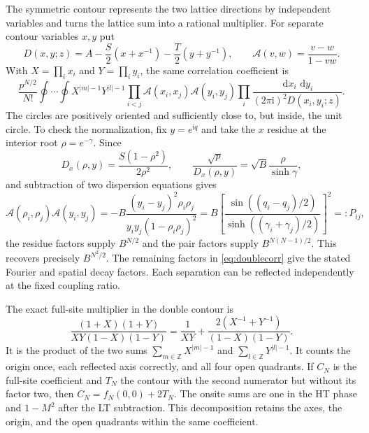 \documentclass[11pt]{article}
\numberwithin{equation}{section}
\theoremstyle{definition}
\newcommand{\Z}{\mathbb Z}
\newcommand{\dd}{\,\mathrm d}
\newcommand{\ii}{\mathrm i}
\newcommand{\cA}{\mathscr A}
\begin{document}
The symmetric contour represents the two lattice directions by
independent variables and turns the lattice sum into a rational
multiplier.
For separate contour variables $x,y$ put
\begin{equation}\label{eq:Dpoly}
 D(x,y;z)=A-\frac S2(x+x^{-1})-\frac T2(y+y^{-1}),\qquad
 \cA(v,w)=\frac{v-w}{1-vw}.
\end{equation}
With $X=\prod_i x_i$ and $Y=\prod_i y_i$, the same correlation
coefficient is
\begin{equation}\label{eq:doublecorr}
 \frac{p^{N/2}}{N!}\oint\cdots\oint
 X^{|m|-1}Y^{|l|-1}
 \prod_{i<j}\cA(x_i,x_j)\cA(y_i,y_j)
 \prod_i\frac{\dd x_i\,\dd y_i}{(2\pi\ii)^2D(x_i,y_i;z)}.
\end{equation}
The circles are positively oriented and sufficiently close to, but inside,
the unit circle. To check the normalization, fix $y=e^{\ii q}$ and
take the $x$ residue at the interior root $\rho=e^{-\gamma}$.
Since
\[
 D_x(\rho,y)=\frac{S(1-\rho^2)}{2\rho^2},\qquad
 \frac{\sqrt p}{D_x(\rho,y)}=\sqrt B\frac{\rho}{\sinh\gamma},
\]
and subtraction of two dispersion equations gives
\begin{equation}\label{eq:cancelpair}
 \cA(\rho_i,\rho_j)\cA(y_i,y_j)
 =-B\frac{(y_i-y_j)^2\rho_i\rho_j}
           {y_iy_j(1-\rho_i\rho_j)^2}
 =B\left[\frac{\sin((q_i-q_j)/2)}
               {\sinh((\gamma_i+\gamma_j)/2)}\right]^2=:P_{ij},
\end{equation}
the residue factors supply $B^{N/2}$ and the pair factors supply
$B^{N(N-1)/2}$. This recovers precisely $B^{N^2/2}$.
The remaining factors in \eqref{eq:doublecorr} give the stated Fourier
and spatial decay factors. Each separation can be reflected
independently at the fixed coupling ratio.

The exact full-site multiplier in the double contour is
\begin{equation}\label{eq:allsites}
 \frac{(1+X)(1+Y)}{XY(1-X)(1-Y)}
 =\frac1{XY}+\frac{2(X^{-1}+Y^{-1})}{(1-X)(1-Y)}.
\end{equation}
It is the product of the two sums $\sum_{m\in\Z}X^{|m|-1}$ and
$\sum_{l\in\Z}Y^{|l|-1}$. It counts the origin once, each reflected
axis correctly, and all four open quadrants. If $C_N$ is the full-site
coefficient and $T_N$ the contour with the second numerator but without
its factor two, then $C_N=f_N(0,0)+2T_N$. The onsite sums are one in
the HT phase and $1-M^2$ after the LT subtraction. This decomposition retains the axes, the origin, and the open quadrants
within the same coefficient.
\end{document}
